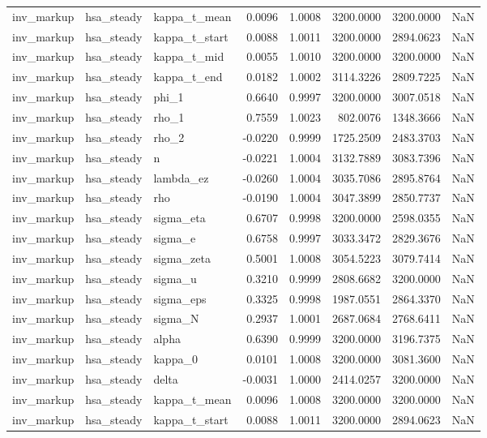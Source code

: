 \begin{tabular}{lllrrrrl}
inv\_markup & hsa\_steady & kappa\_t\_mean & 0.0096 & 1.0008 & 3200.0000 & 3200.0000 & NaN \\
inv\_markup & hsa\_steady & kappa\_t\_start & 0.0088 & 1.0011 & 3200.0000 & 2894.0623 & NaN \\
inv\_markup & hsa\_steady & kappa\_t\_mid & 0.0055 & 1.0010 & 3200.0000 & 3200.0000 & NaN \\
inv\_markup & hsa\_steady & kappa\_t\_end & 0.0182 & 1.0002 & 3114.3226 & 2809.7225 & NaN \\
inv\_markup & hsa\_steady & phi\_1 & 0.6640 & 0.9997 & 3200.0000 & 3007.0518 & NaN \\
inv\_markup & hsa\_steady & rho\_1 & 0.7559 & 1.0023 & 802.0076 & 1348.3666 & NaN \\
inv\_markup & hsa\_steady & rho\_2 & -0.0220 & 0.9999 & 1725.2509 & 2483.3703 & NaN \\
inv\_markup & hsa\_steady & n & -0.0221 & 1.0004 & 3132.7889 & 3083.7396 & NaN \\
inv\_markup & hsa\_steady & lambda\_ez & -0.0260 & 1.0004 & 3035.7086 & 2895.8764 & NaN \\
inv\_markup & hsa\_steady & rho & -0.0190 & 1.0004 & 3047.3899 & 2850.7737 & NaN \\
inv\_markup & hsa\_steady & sigma\_eta & 0.6707 & 0.9998 & 3200.0000 & 2598.0355 & NaN \\
inv\_markup & hsa\_steady & sigma\_e & 0.6758 & 0.9997 & 3033.3472 & 2829.3676 & NaN \\
inv\_markup & hsa\_steady & sigma\_zeta & 0.5001 & 1.0008 & 3054.5223 & 3079.7414 & NaN \\
inv\_markup & hsa\_steady & sigma\_u & 0.3210 & 0.9999 & 2808.6682 & 3200.0000 & NaN \\
inv\_markup & hsa\_steady & sigma\_eps & 0.3325 & 0.9998 & 1987.0551 & 2864.3370 & NaN \\
inv\_markup & hsa\_steady & sigma\_N & 0.2937 & 1.0001 & 2687.0684 & 2768.6411 & NaN \\
inv\_markup & hsa\_steady & alpha & 0.6390 & 0.9999 & 3200.0000 & 3196.7375 & NaN \\
inv\_markup & hsa\_steady & kappa\_0 & 0.0101 & 1.0008 & 3200.0000 & 3081.3600 & NaN \\
inv\_markup & hsa\_steady & delta & -0.0031 & 1.0000 & 2414.0257 & 3200.0000 & NaN \\
inv\_markup & hsa\_steady & kappa\_t\_mean & 0.0096 & 1.0008 & 3200.0000 & 3200.0000 & NaN \\
inv\_markup & hsa\_steady & kappa\_t\_start & 0.0088 & 1.0011 & 3200.0000 & 2894.0623 & NaN \\

\end{tabular}
